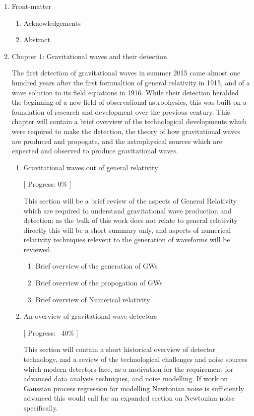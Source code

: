 \documentclass{kentigern}
\theoremstyle{definition}
\begin{document}
\begin{enumerate}
\item Front-matter
  \begin{enumerate}
    \item Acknowledgements
    \item Abstract
  \end{enumerate}
\item Chapter 1: Gravitational waves and their detection
  
  The first detection of gravitational waves in summer 2015 came
  almost one hundred years after the first formualtion of general
  relativity in 1915, and of a wave solution to its field equations
  in 1916. While their detection heralded the beginning of a new field
  of observational astrophysics, this was built on a foundation of
  research and development over the previous century. This chapter
  will contain a brief overview of the technological developments
  which were required to make the detection, the theory of how
  gravitational waves are produced and propogate, and the
  astrophysical sources which are expected and observed to produce
  gravitational waves.
  \begin{enumerate}
  \item Gravitational waves out of general relativity
    
    [ Progress: 0\% ]
    
    This section will be a brief review of the aspects of General
    Relativity which are required to understand gravitational wave
    production and detection; as the bulk of this work does not relate
    to general relativity directly this will be a short summary only,
    and aspects of numerical relativity techniques relevent to the
    generation of waveforms will be reviewed.
    \begin{enumerate}
    \item Brief overview of the generation of GWs
     \item Brief overview of the propogation of GWs
     \item Brief overview of Numerical relativity
    \end{enumerate}

    
 \item An overview of gravitational wave detectors

   [ Progress: ~40\% ]
   
   This section will contain a short historical overview of detector
   technology, and a review of the technological challenges and noise
   sources which modern detectors face, as a motivation for the
   requirement for advanced data analysis techniques, and noise
   modelling. If work on Gaussian process regression for modelling
   Newtonian noise is sufficiently advanced this would call for an
   expanded section on Newtonian noise specifically.


\end{enumerate}
\end{enumerate}
\end{document}
